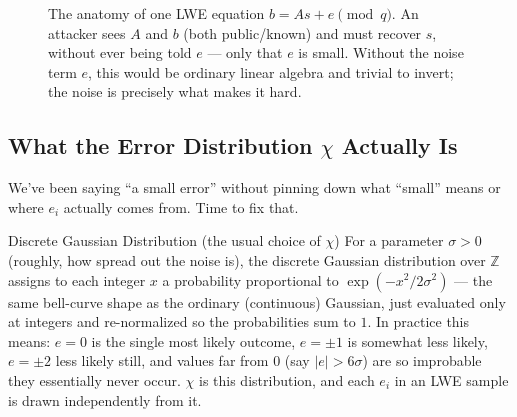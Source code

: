 \begin{figure}[h]
\centering
{}
\caption{The anatomy of one LWE equation $b = As + e \pmod q$. An attacker sees $A$ and $b$ (both public/known) and must recover $s$, without ever being told $e$ --- only that $e$ is small. Without the noise term $e$, this would be ordinary linear algebra and trivial to invert; the noise is precisely what makes it hard.}
\label{fig:lwe-anatomy}
\end{figure}

\subsection{What the Error Distribution $\chi$ Actually Is}
\label{sec:L2:what-the-error-distribution-actually-is}

We've been saying ``a small error'' without pinning down what ``small'' means or where $e_i$ actually comes from. Time to fix that.

\begin{defbox}{Discrete Gaussian Distribution (the usual choice of $\chi$)}
For a parameter $\sigma>0$ (roughly, how spread out the noise is), the discrete Gaussian distribution over $\mathbb{Z}$ assigns to each integer $x$ a probability proportional to $\exp(-x^2/2\sigma^2)$ --- the same bell-curve shape as the ordinary (continuous) Gaussian, just evaluated only at integers and re-normalized so the probabilities sum to $1$. In practice this means: $e=0$ is the single most likely outcome, $e=\pm 1$ is somewhat less likely, $e=\pm 2$ less likely still, and values far from $0$ (say $|e| > 6\sigma$) are so improbable they essentially never occur. $\chi$ is this distribution, and each $e_i$ in an LWE sample is drawn independently from it.
\end{defbox}

